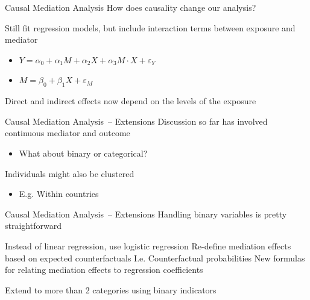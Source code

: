 \documentclass[14pt]{beamer}
\newcommand{\CMA}{Causal Mediation Analysis}
\begin{document}
\begin{frame}{\CMA}
    How does causality change our analysis? \newline

    Still fit regression models, but include interaction terms between exposure and mediator
    \begin{itemize}
        \item $Y = \alpha_0 + \alpha_1 M + \alpha_2 X + \alpha_3 M \cdot X + \varepsilon_Y$
        \item $M = \beta_0 + \beta_1 X + \varepsilon_M$ \newline
    \end{itemize}

    Direct and indirect effects now depend on the levels of the exposure

\end{frame}


\begin{frame}{\CMA\ -- Extensions}
    Discussion so far has involved continuous mediator and outcome
    \begin{itemize}
        \item What about binary or categorical? \newline
    \end{itemize}

    Individuals might also be clustered
    \begin{itemize}
        \item E.g. Within countries
    \end{itemize}

\end{frame}

\begin{frame}{\CMA\ -- Extensions}
    Handling binary variables is pretty straightforward
    \begin{outline}
        \1 Instead of linear regression, use logistic regression
        \1 Re-define mediation effects based on expected counterfactuals
            \2 I.e. Counterfactual probabilities
        \1 New formulas for relating mediation effects to regression coefficients \newline
    \end{outline}

    Extend to more than 2 categories using binary indicators
\end{frame}
\end{document}
